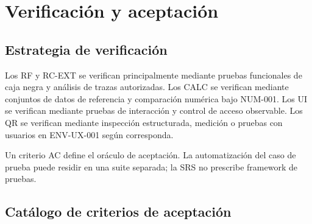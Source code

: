 \documentclass[10pt,letterpaper]{article}
\begin{document}
\section{Verificación y aceptación}
\subsection{Estrategia de verificación}
Los RF y RC-EXT se verifican principalmente mediante pruebas funcionales de caja negra y análisis de trazas autorizadas. Los CALC se verifican mediante conjuntos de datos de referencia y comparación numérica bajo NUM-001. Los UI se verifican mediante pruebas de interacción y control de acceso observable. Los QR se verifican mediante inspección estructurada, medición o pruebas con usuarios en ENV-UX-001 según corresponda.

Un criterio AC define el oráculo de aceptación. La automatización del caso de prueba puede residir en una suite separada; la SRS no prescribe framework de pruebas.

\subsection{Catálogo de criterios de aceptación}
\end{document}

